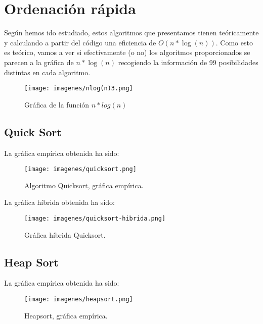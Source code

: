 \section{Ordenación rápida} %
Según hemos ido estudiado, estos algoritmos que presentamos tienen teóricamente y calculando a partir del código una eficiencia de $O(n*\log(n) )$. Como esto es teórico, vamos a ver si efectivamente (o no) los algoritmos proporcionados se parecen a la gráfica de $n*\log(n)$ recogiendo la información de 99 posibilidades distintas en cada algoritmo.
\begin{figure}[H]
	\centering
	\texttt{[image: imagenes/nlog(n)3.png]}
	\caption{Gráfica de la función $n*log(n)$}
	\label{fig:E8}
\end{figure}
\subsection{Quick Sort}
La gráfica empírica obtenida ha sido:
\begin{figure}[H]
	\centering
	\texttt{[image: imagenes/quicksort.png]}
	\caption{Algoritmo Quicksort, gráfica empírica. }
	\label{fig:E9}
\end{figure}

La gráfica híbrida obtenida ha sido:
\begin{figure}[H]
	\centering
	\texttt{[image: imagenes/quicksort-hibrida.png]}
	\caption{Gráfica híbrida Quicksort.}
	\label{fig:E10}
\end{figure}

\subsection{Heap Sort}
La gráfica empírica obtenida ha sido:
\begin{figure}[H]
	\centering
	\texttt{[image: imagenes/heapsort.png]}
	\caption{Heapsort, gráfica empírica.}
	\label{fig:E11}
\end{figure}

